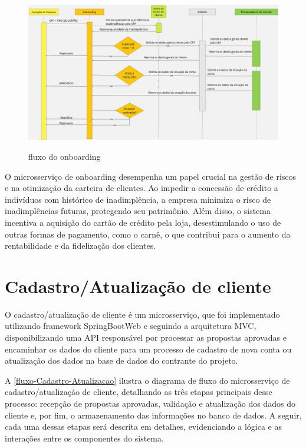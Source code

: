 \begin{figure}
    \centering
    \caption{fluxo do onboarding}
    \includegraphics[width=1\textwidth]{arquivos/imagens/onboarding-fluxo.jpg}
    \label{fluxo-onboarding}
\end{figure}

O microsserviço de onboarding desempenha um papel crucial na gestão de riscos e na otimização da carteira de clientes. 
Ao impedir a concessão de crédito a indivíduos com histórico de inadimplência, a empresa minimiza o risco de 
inadimplências futuras, protegendo seu patrimônio. Além disso, o sistema incentiva a aquisição do cartão de crédito 
pela loja, desestimulando o uso de outras formas de pagamento, como o carnê, o que contribui para o aumento da 
rentabilidade e da fidelização dos clientes.

\section{Cadastro/Atualização de cliente}

O cadastro/atualização de cliente é um microsserviço, que foi implementado utilizando framework SpringBootWeb e 
seguindo a arquitetura MVC, disponibilizando uma API responsável por processar as propostas aprovadas e encaminhar 
os dados do cliente para um processo de cadastro de nova conta ou atualização dos dados na base de dados do 
contrante do projeto.

A \autoref{fluxo-Cadastro-Atualizacao} ilustra o diagrama de fluxo do microsserviço de cadastro/atualização de cliente, 
detalhando as três etapas principais desse processo: recepção de propostas aprovadas, validação e 
atualização dos dados do cliente e, por fim, o armazenamento das informações no banco de dados. 
A seguir, cada uma dessas etapas será descrita em detalhes, evidenciando a lógica e as interações entre os 
componentes do sistema. 

